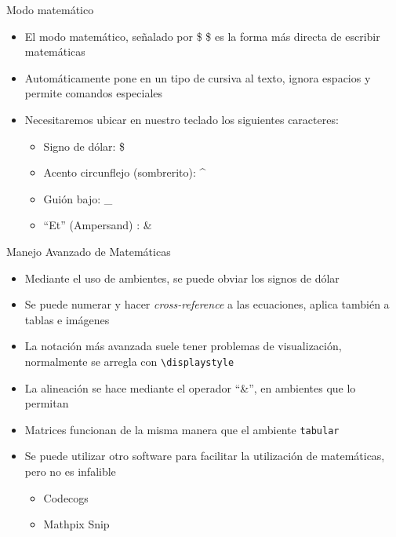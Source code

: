 \documentclass{beamer}
\begin{document}
 \begin{frame}{Modo matemático}
 \begin{itemize}
     \item El modo matemático, señalado por \$ \$ es la forma más directa de escribir matemáticas
     \item Automáticamente pone en un tipo de cursiva al texto, ignora espacios y permite comandos especiales
     \item Necesitaremos ubicar en nuestro teclado los siguientes caracteres: 
     \begin{itemize}
     \item Signo de dólar: \$
         \item Acento circunflejo (sombrerito): \^{}
         \item Guión bajo: \_
         \item ``Et'' (Ampersand) : \&
     \end{itemize}
 \end{itemize}
 \end{frame}
 \begin{frame}{Manejo Avanzado de Matemáticas}
 \begin{itemize}
     \item Mediante el uso de ambientes, se puede obviar los signos de dólar
     \item Se puede numerar y hacer \textit{cross-reference} a las ecuaciones, aplica también a tablas e imágenes
     \item La notación más avanzada suele tener problemas de visualización, normalmente se arregla con \texttt{\textbackslash displaystyle}
     \item La alineación se hace mediante el operador ``\&'', en ambientes que lo permitan\textbf{}
     \item Matrices funcionan de la misma manera que el ambiente \texttt{tabular}
     \item Se puede utilizar otro software para facilitar la utilización de matemáticas, pero no es infalible
\begin{itemize}
    \item Codecogs
    \item Mathpix Snip
\end{itemize}
 \end{itemize}
     
 \end{frame}
\end{document}
